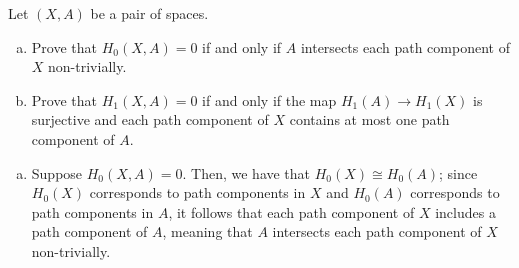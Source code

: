 \documentclass[10pt]{mypackage}
\begin{document}
\RaggedRight
\begin{problem}[Problem 1]
  Let $\left( X,A \right)$ be a pair of spaces. 
  \begin{enumerate}[(a)]
    \item Prove that $H_0\left( X,A \right) = 0$ if and only if $A$ intersects each path component of $X$ non-trivially.
    \item Prove that $H_1\left( X,A \right) = 0$ if and only if the map $H_1(A)\rightarrow H_1(X)$ is surjective and each path component of $X$ contains at most one path component of $A$.
  \end{enumerate}
\end{problem}
\begin{solution}\hfill
  \begin{enumerate}[(a)]
    \item Suppose $H_0\left( X,A \right) = 0$. Then, we have that $H_0\left( X \right)\cong H_0\left( A \right)$; since $H_0\left( X \right)$ corresponds to path components in $X$ and $H_0\left( A \right)$ corresponds to path components in $A$, it follows that each path component of $X$ includes a path component of $A$, meaning that $A$ intersects each path component of $X$ non-trivially.


\end{enumerate}
\end{solution}
\end{document}
